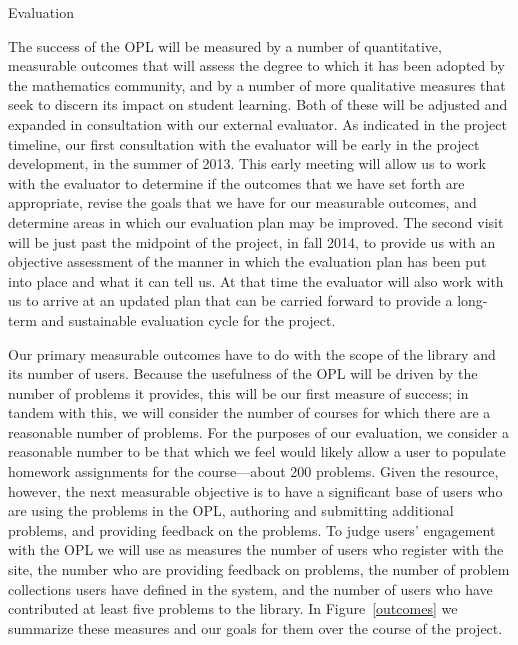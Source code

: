 \documentclass[11pt]{article}
\begin{document}
\begin{section}{Evaluation}

The success of the OPL will be measured by a number of quantitative,
measurable outcomes that will assess the degree to which it has been
adopted by the mathematics community, and by a number of more qualitative
measures that seek to discern its impact on student learning.  Both of
these will be adjusted and expanded in consultation with our external
evaluator.  As indicated in the project timeline, our first consultation
with the evaluator will be early in the project development, in the summer
of 2013.  This early meeting will allow us to work with the evaluator to
determine if the outcomes that we have set forth are appropriate, revise
the goals that we have for our measurable outcomes, and determine areas in
which our evaluation plan may be improved.  The second visit will be just
past the midpoint of the project, in fall 2014, to provide us with an
objective assessment of the manner in which the evaluation plan has been
put into place and what it can tell us.  At that time the evaluator will
also work with us to arrive at an updated plan that can be carried forward
to provide a long-term and sustainable evaluation cycle for the project.

Our primary measurable outcomes have to do with the scope of the library
and its number of users.  Because the usefulness of the OPL will be driven
by the number of problems it provides, this will be our first measure of
success; in tandem with this, we will consider the number of courses for
which there are a reasonable number of problems.  For the purposes of our
evaluation, we consider a reasonable number to be that which we feel would
likely allow a user to populate homework assignments for the
course---about 200 problems.  Given the resource, however, the next
measurable objective is to have a significant base of users who are using
the problems in the OPL, authoring and submitting additional problems, and
providing feedback on the problems.  To judge users' engagement with the
OPL we will use as measures the number of users who register with the
site, the number who are providing feedback on problems, the number of
problem collections users have defined in the system, and the number of
users who have contributed at least five problems to the library.  In
Figure~\ref{outcomes} we summarize these measures and our goals for them
over the course of the project.


\end{section}
\end{document}
